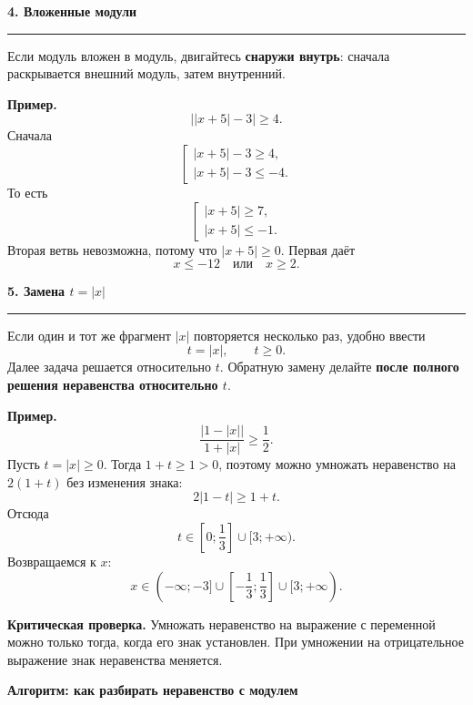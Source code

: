 \documentclass[a4paper,12pt]{article}
\newcommand{\lessonsection}[1]{%
  \vspace{0.5em}
  {\Large\bfseries\color{darkaccent}#1}\par\vspace{0.35em}
  {\color{accent}\rule{\linewidth}{0.6pt}}\vspace{0.6em}
}
\newcommand{\key}[1]{\textbf{\color{darkaccent}#1}}
\begin{document}
\lessonsection{4. Вложенные модули}

Если модуль вложен в модуль, двигайтесь \key{снаружи внутрь}: сначала раскрывается внешний модуль, затем внутренний.

\textbf{Пример.}
\[
\bigl||x+5|-3\bigr|\ge4.
\]
Сначала
\[
\left[
\begin{array}{l}
|x+5|-3\ge4,\\
|x+5|-3\le-4.
\end{array}
\right.
\]
То есть
\[
\left[
\begin{array}{l}
|x+5|\ge7,\\
|x+5|\le-1.
\end{array}
\right.
\]
Вторая ветвь невозможна, потому что $|x+5|\ge0$. Первая даёт
\[
x\le-12\quad\text{или}\quad x\ge2.
\]

\lessonsection{5. Замена $t=|x|$}

Если один и тот же фрагмент $|x|$ повторяется несколько раз, удобно ввести
\[
t=|x|,\qquad t\ge0.
\]
Далее задача решается относительно $t$. Обратную замену делайте \key{после полного решения неравенства относительно $t$}.

\textbf{Пример.}
\[
\frac{|1-|x||}{1+|x|}\ge\frac12.
\]
Пусть $t=|x|\ge0$. Тогда $1+t\ge1>0$, поэтому можно умножать неравенство на $2(1+t)$ без изменения знака:
\[
2|1-t|\ge1+t.
\]
Отсюда
\[
t\in\left[0;\frac13\right]\cup[3;+\infty).
\]
Возвращаемся к $x$:
\[
\boxed{x\in(-\infty;-3]\cup\left[-\frac13;\frac13\right]\cup[3;+\infty)}.
\]

\key{Критическая проверка.} Умножать неравенство на выражение с переменной можно только тогда, когда его знак установлен. При умножении на отрицательное выражение знак неравенства меняется.

\clearpage

\thispagestyle{plain}
\begin{center}
{\Large\bfseries\color{darkaccent}Алгоритм: как разбирать неравенство с модулем}\par
\vspace{8mm}
\end{center}
\end{document}
